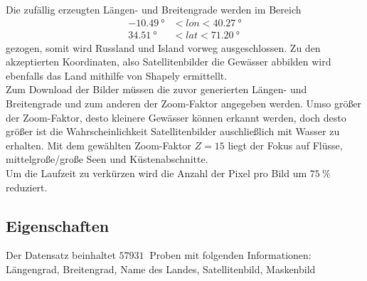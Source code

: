 Die zufällig erzeugten Längen- und Breitengrade werden im Bereich
\begin{align*}
    \SI{-10.49}{\degree} &< lon < \SI{40.27}{\degree} \\
    \SI{34.51}{\degree} &< lat < \SI{71.20}{\degree}
\end{align*}
gezogen, somit wird Russland und Island vorweg ausgeschlossen.
Zu den akzeptierten Koordinaten, also Satellitenbilder die Gewässer abbilden wird ebenfalls das Land mithilfe von Shapely\cite{shapely} ermittellt.
\\
Zum Download der Bilder müssen die zuvor generierten Längen- und Breitengrade und zum anderen der Zoom-Faktor angegeben werden.
Umso größer der Zoom-Faktor, desto kleinere Gewässer können erkannt werden, doch desto größer ist die Wahrscheinlichkeit Satellitenbilder auschließlich mit Wasser zu erhalten.
Mit dem gewählten Zoom-Faktor $Z = 15$ liegt der Fokus auf Flüsse, mittelgroße/große Seen und Küstenabschnitte.
\\
Um die Laufzeit zu verkürzen wird die Anzahl der Pixel pro Bild um $\SI{75}{\percent}$ reduziert.

\subsection{Eigenschaften}

Der Datensatz beinhaltet $\SI{57931}{}$ Proben mit folgenden Informationen:
\\
Längengrad, Breitengrad, Name des Landes, Satellitenbild, Maskenbild
\\

